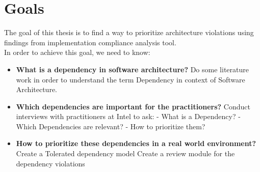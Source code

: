 \section{Goals}
The goal of this thesis is to find a way to prioritize architecture violations using findings from implementation compliance analysis tool. \\In order to achieve this goal, we need to know:

\begin{itemize}
	\item \textbf{What is a dependency in software architecture?}\newline
				Do some literature work in order to understand the term Dependency in context of Software Architecture.
	\item \textbf{Which dependencies are important for the practitioners?} \newline
				Conduct interviews with practitioners at Intel to ask: \newline
				- What is a Dependency? \newline
				- Which Dependencies are relevant? \newline
				- How to prioritize them?	 
	\item \textbf{How to prioritize these dependencies in a real world environment?} \newline
				Create a Tolerated dependency model
				Create a review module for the dependency violations		
\end{itemize}